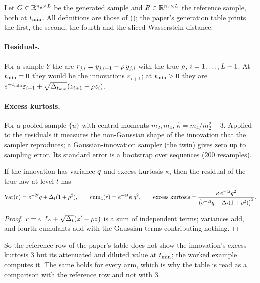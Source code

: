 Let $G\in\mathbb{R}^{n_g\times L}$ be the generated sample and $R\in\mathbb{R}^{n_r\times L}$
the reference sample, both at $t_{\min}$. All definitions are those of
 (); the paper's generation
table prints the first, the second, the fourth and the sliced Wasserstein distance.

\paragraph{Residuals.} For a sample $Y$ the  are
$r_{j,i}=y_{j,i+1}-\rho\,y_{j,i}$ with the true $\rho$, $i=1,\dots,L-1$. At
$t_{\min}=0$ they would be the innovations $\varepsilon_{i+1}$; at $t_{\min}>0$ they are
$e^{-t_{\min}}\varepsilon_{i+1}+\sqrt{\Delta_{t_{\min}}}(z_{i+1}-\rho z_i)$.

\paragraph{Excess kurtosis.} For a pooled sample $\{u\}$ with central moments $m_2,m_4$,
$\widehat\kappa=m_4/m_2^2-3$. Applied to the residuals it measures the non-Gaussian
shape of the innovation that the sampler reproduces; a Gaussian-innovation sampler
(the twin) gives zero up to sampling error. Its standard error is a bootstrap over
sequences ($200$ resamples).

\begin{proposition}
\label{prop:rev:kurt}
If the innovation has variance $q$ and excess kurtosis $\kappa$, then the residual
of the true law at level $t$ has
\[
  \operatorname{Var}(r)=e^{-2t}q+\Delta_t(1+\rho^2),\qquad
  \operatorname{cum}_4(r)=e^{-4t}\kappa\,q^2,\qquad
  \text{excess kurtosis}=\frac{\kappa\,e^{-4t}q^2}{\bigl(e^{-2t}q+\Delta_t(1+\rho^2)\bigr)^2}.
\]
\end{proposition}

\begin{proof}
$r=e^{-t}\varepsilon+\sqrt{\Delta_t}(z'-\rho z)$ is a sum of independent terms; variances
add, and fourth cumulants add with the Gaussian terms contributing nothing.
\end{proof}

So the reference row of the paper's table does not show the innovation's excess
kurtosis $3$ but its attenuated and diluted value at $t_{\min}$; the worked example
computes it. The same holds for every arm, which is why the table is read as a
comparison with the reference row and not with $3$.

